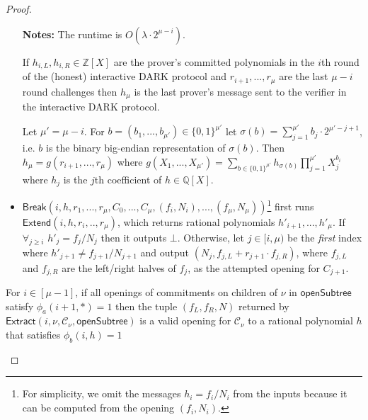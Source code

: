 \begin{proof}
\begin{itemize}
\textbf{Notes:} 
The runtime is $O(\lambda \cdot 2^{\mu - i})$. 

If $h_{i,L}, h_{i,R}  \in \mathbb{Z}[X]$ are the prover's committed polynomials in the $i$th round of the (honest) interactive DARK protocol and $r_{i+1},...,r_\mu$ are the last $\mu - i$ round challenges then $h_\mu$ is the last prover's message sent to the verifier in the interactive DARK protocol. 

 Let $\mu' = \mu - i$. For $b = (b_1,...,b_{\mu'}) \in \{0,1\}^{\mu'}$ let $\sigma(b) = \sum_{j =1}^{\mu'} b_j \cdot 2^{\mu' - j + 1}$, i.e. $b$ is the binary big-endian representation of $\sigma(b)$. Then $h_\mu = g(r_{i+1},...,r_\mu)$ where $g(X_1,...,X_{\mu'}) = \sum_{b \in \{0,1\}^{\mu'}} h_{\sigma(b)} \prod_{j=1}^{\mu'}X_j^{b_i}$ where $h_j$ is the $j$th coefficient of $h \in \mathbb{Q}[X]$. 
 
 \item $\textsf{Break}(i, h, r_1,...,r_\mu, C_0,...,C_\mu, (f_i, N_i),...,(f_\mu, N_\mu))$\footnote{For simplicity, we omit the messages $h_i = f_i/N_i$ from the inputs because it can be computed from the opening $(f_i, N_i)$.}  first runs $\textsf{Extend}(i, h, r_i,..,r_{\mu})$, which returns rational polynomials $h'_{i+1},...,h'_{\mu}$. If $\forall_{j \geq i}$ $h'_j = f_j/N_j$ then it outputs $\bot$. Otherwise, let $j \in [i, \mu)$ be the \textit{first} index where $h'_{j+1}\neq f_{j+1}/N_{j+1}$ and output $(N_j, f_{j, L} + r_{j+1} \cdot  f_{j, R})$, where $f_{j, L}$ and $f_{j, R}$ are the left/right halves of $f_j$, as the attempted opening for $C_{j+1}$.
\end{itemize}

\begin{subclaim} 
For $i \in [\mu-1]$, if all openings of commitments on children of $\nu$ in $\textsf{openSubtree}$ satisfy $\phi_a(i+1, *)=1$ then the tuple $(f_L, f_R, N)$ returned by $\textsf{Extract}(i, \nu, \mathcal{C}_\nu, \textsf{openSubtree})$ is a valid opening for $\mathcal{C}_\nu$ to a rational polynomial $h$ that satisfies $\phi_b(i, h) = 1$ 
\end{subclaim} 


\end{proof}
